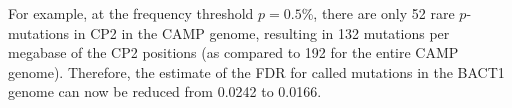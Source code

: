 For example, at the frequency threshold $p=0.5$\%, there are only 52 rare $p$-mutations in CP2 in the CAMP genome, resulting in 132 mutations per megabase of the CP2 positions (as compared to 192 for the entire CAMP genome). Therefore, the estimate of the FDR for called mutations in the BACT1 genome can now be reduced from 0.0242 to 0.0166.\endinput